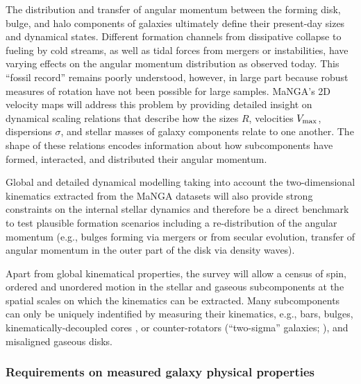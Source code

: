 \documentclass[preprint,11pt]{aastex}
\begin{document}
The distribution and transfer of angular momentum between the forming
disk, bulge, and halo components of galaxies ultimately define their
present-day sizes and dynamical states.  Different formation channels
from dissipative collapse to fueling by cold streams, as well as tidal
forces from mergers or instabilities, have varying effects on the
angular momentum distribution as observed today.  This ``fossil
record'' remains poorly understood, however, in large part because
robust measures of rotation have not been possible for large samples.
MaNGA's 2D velocity maps will address this problem by providing
detailed insight on dynamical scaling relations that describe how the
sizes $R$, velocities $V_{\rm max}$, dispersions $\sigma$, and
stellar masses of galaxy components relate to one another.  The shape
of these relations encodes information about how subcomponents have
formed, interacted, and distributed their angular momentum. 

Global and detailed dynamical modelling taking into account the two-dimensional
kinematics extracted from the MaNGA datasets will also provide
strong constraints on the internal stellar dynamics and therefore 
be a direct benchmark to test plausible formation scenarios including
a re-distribution of the angular momentum (e.g., bulges forming via mergers
or from secular evolution, transfer of angular momentum in the outer part of the disk via density waves).

Apart from global kinematical properties, the survey will allow a
census of spin, ordered and unordered motion in the stellar and
gaseous subcomponents at the spatial scales on which the kinematics
can be extracted. Many subcomponents can only be uniquely indentified
by measuring their kinematics, e.g., bars, bulges,
kinematically-decoupled cores \citep{vandenbosch2008}, or
counter-rotators (``two-sigma'' galaxies; \citealt{krajnovic11}), and
misaligned gaseous disks.


\subsubsection{Requirements on measured galaxy physical properties}
\end{document}
